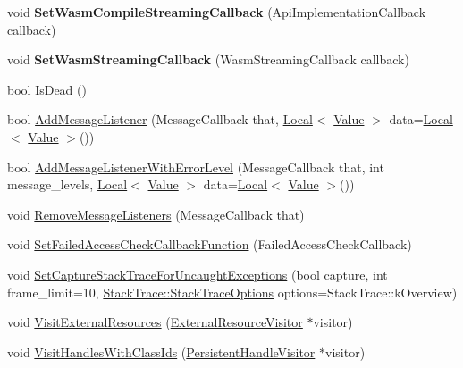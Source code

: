 \begin{DoxyCompactItemize}
\item 
\mbox{\label{classv8_1_1Isolate_a9cefe4c064119c29e6dd038a4d051d7a}} 
void {\bfseries Set\+Wasm\+Compile\+Streaming\+Callback} (Api\+Implementation\+Callback callback)
\item 
\mbox{\label{classv8_1_1Isolate_a5dc983fb272fc07e7f3d0e01cb656fa2}} 
void {\bfseries Set\+Wasm\+Streaming\+Callback} (Wasm\+Streaming\+Callback callback)
\item 
bool \mbox{\hyperlink{classv8_1_1Isolate_a603a9bc7860d7936bce2dd45829869c3}{Is\+Dead}} ()
\item 
bool \mbox{\hyperlink{classv8_1_1Isolate_a1aaf99c9ce853fdece7a3b8fc4df49d5}{Add\+Message\+Listener}} (Message\+Callback that, \mbox{\hyperlink{classv8_1_1Local}{Local}}$<$ \mbox{\hyperlink{classv8_1_1Value}{Value}} $>$ data=\mbox{\hyperlink{classv8_1_1Local}{Local}}$<$ \mbox{\hyperlink{classv8_1_1Value}{Value}} $>$())
\item 
bool \mbox{\hyperlink{classv8_1_1Isolate_a6f617fa658aafcb299f386e637fd2e11}{Add\+Message\+Listener\+With\+Error\+Level}} (Message\+Callback that, int message\+\_\+levels, \mbox{\hyperlink{classv8_1_1Local}{Local}}$<$ \mbox{\hyperlink{classv8_1_1Value}{Value}} $>$ data=\mbox{\hyperlink{classv8_1_1Local}{Local}}$<$ \mbox{\hyperlink{classv8_1_1Value}{Value}} $>$())
\item 
void \mbox{\hyperlink{classv8_1_1Isolate_a0319e55b26ba3ac51d867b37b917a21f}{Remove\+Message\+Listeners}} (Message\+Callback that)
\item 
void \mbox{\hyperlink{classv8_1_1Isolate_ab9ef29fc049d82e0c33994632b4f6ba6}{Set\+Failed\+Access\+Check\+Callback\+Function}} (Failed\+Access\+Check\+Callback)
\item 
void \mbox{\hyperlink{classv8_1_1Isolate_a0ea70b9953abf15184a20eba6aab389f}{Set\+Capture\+Stack\+Trace\+For\+Uncaught\+Exceptions}} (bool capture, int frame\+\_\+limit=10, \mbox{\hyperlink{classv8_1_1StackTrace_a9704e4a37949eb8eb8ccddbddf161492}{Stack\+Trace\+::\+Stack\+Trace\+Options}} options=Stack\+Trace\+::k\+Overview)
\item 
void \mbox{\hyperlink{classv8_1_1Isolate_a44d513b6426299de4c16e069958a723b}{Visit\+External\+Resources}} (\mbox{\hyperlink{classv8_1_1ExternalResourceVisitor}{External\+Resource\+Visitor}} $\ast$visitor)
\item 
void \mbox{\hyperlink{classv8_1_1Isolate_a8c60c4e0f61250a422ba2336dcd50a75}{Visit\+Handles\+With\+Class\+Ids}} (\mbox{\hyperlink{classv8_1_1PersistentHandleVisitor}{Persistent\+Handle\+Visitor}} $\ast$visitor)

\end{DoxyCompactItemize}
